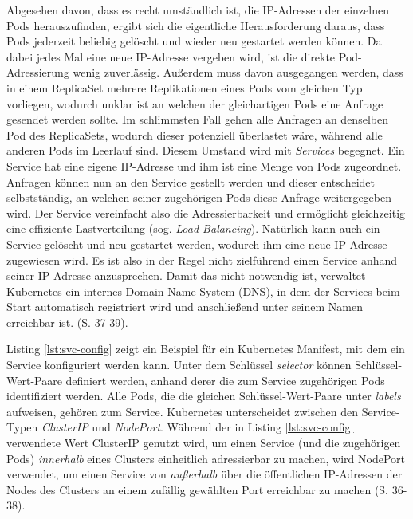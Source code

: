 \documentclass[11pt,a4paper]{article}
\begin{document}
Abgesehen davon, dass es recht umständlich ist, die IP-Adressen der einzelnen Pods herauszufinden,
ergibt sich die eigentliche Herausforderung daraus, dass Pods jederzeit beliebig gelöscht
und wieder neu gestartet werden können. Da dabei jedes Mal eine neue IP-Adresse vergeben wird,
ist die direkte Pod-Adressierung wenig zuverlässig. Außerdem muss davon ausgegangen werden, dass
in einem ReplicaSet mehrere Replikationen eines Pods vom gleichen Typ vorliegen, wodurch unklar ist
an welchen der gleichartigen Pods eine Anfrage gesendet werden sollte. Im schlimmsten Fall gehen alle Anfragen
an denselben Pod des ReplicaSets, wodurch dieser potenziell überlastet wäre, während alle anderen Pods im Leerlauf sind.
Diesem Umstand wird mit \emph{Services} begegnet. Ein Service hat eine eigene IP-Adresse und ihm ist eine Menge
von Pods zugeordnet. Anfragen können nun an den Service gestellt werden und dieser entscheidet selbstständig,
an welchen seiner zugehörigen Pods diese Anfrage weitergegeben wird. Der Service vereinfacht also die
Adressierbarkeit und ermöglicht gleichzeitig eine effiziente Lastverteilung (sog. \emph{Load Balancing}).
Natürlich kann auch ein Service gelöscht und neu gestartet werden, wodurch ihm eine neue IP-Adresse zugewiesen wird.
Es ist also in der Regel nicht zielführend einen Service anhand seiner IP-Adresse anzusprechen.
Damit das nicht notwendig ist, verwaltet Kubernetes ein internes Domain-Name-System (DNS), in dem
der Services beim Start automatisch registriert wird und anschließend unter seinem Namen
erreichbar ist. \cite{Schmeling_Dargatz_2022} (S. 37-39).

Listing \ref{lst:svc-config} zeigt ein Beispiel für ein Kubernetes Manifest,
mit dem ein Service konfiguriert werden kann.
Unter dem Schlüssel \emph{selector} können Schlüssel-Wert-Paare definiert werden,
anhand derer die zum Service zugehörigen Pods identifiziert werden. Alle Pods, die
die gleichen Schlüssel-Wert-Paare unter \emph{labels} aufweisen, gehören zum Service.
Kubernetes unterscheidet zwischen den Service-Typen \emph{ClusterIP} und \emph{NodePort}.
Während der in Listing \ref{lst:svc-config} verwendete Wert ClusterIP genutzt wird, um einen Service
(und die zugehörigen Pods) \emph{innerhalb} eines Clusters
einheitlich adressierbar zu machen, wird NodePort verwendet, um einen Service von \emph{außerhalb}
über die öffentlichen IP-Adressen der Nodes des Clusters an einem zufällig gewählten Port erreichbar zu machen \cite{Schmeling_Dargatz_2022} (S. 36-38).
% 
\end{document}
